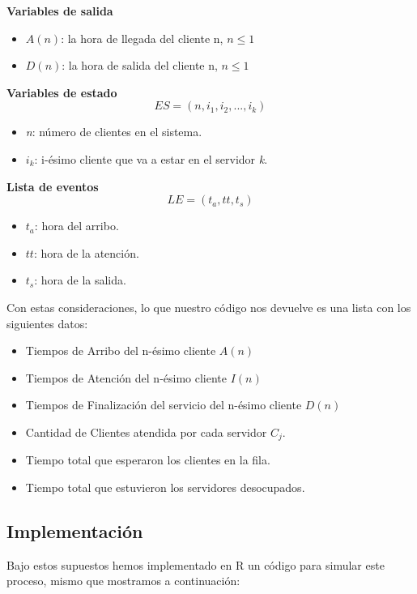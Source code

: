 \documentclass[]{article}
\providecommand{\tightlist}{%
  \setlength{\itemsep}{0pt}\setlength{\parskip}{0pt}}
\begin{document}
\textbf{Variables de salida}

\begin{itemize}
\tightlist
\item
  \(A(n)\): la hora de llegada del cliente n, \(n\leq1\)
\item
  \(D(n)\): la hora de salida del cliente n, \(n\leq1\)
\end{itemize}

\textbf{Variables de estado} \[ ES=(n,i_{1},i_{2},...,i_{k}) \]

\begin{itemize}
\tightlist
\item
  \textit{n}: número de clientes en el sistema.
\item
  \(i_k\): i-ésimo cliente que va a estar en el servidor \textit{k}.
\end{itemize}

\textbf{Lista de eventos} \[LE=(t_a,tt,t_s)\]

\begin{itemize}
\tightlist
\item
  \(t_a\): hora del arribo.
\item
  \(tt\): hora de la atención.
\item
  \(t_s\): hora de la salida.
\end{itemize}

Con estas consideraciones, lo que nuestro código nos devuelve es una
lista con los siguientes datos:

\begin{itemize}
\tightlist
\item
  Tiempos de Arribo del n-ésimo cliente \(A(n)\)
\item
  Tiempos de Atención del n-ésimo cliente \(I(n)\)
\item
  Tiempos de Finalización del servicio del n-ésimo cliente \(D(n)\)
\item
  Cantidad de Clientes atendida por cada servidor \(C_j\).
\item
  Tiempo total que esperaron los clientes en la fila.
\item
  Tiempo total que estuvieron los servidores desocupados.
\end{itemize}

\subsection{Implementación}\label{implementacion}

Bajo estos supuestos hemos implementado en R un código para simular este
proceso, mismo que mostramos a continuación:
\end{document}
